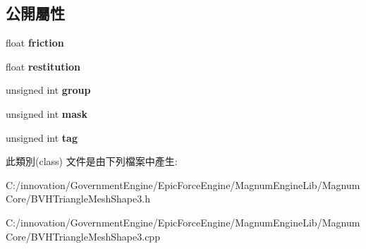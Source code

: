 \subsection*{公開屬性}
\begin{DoxyCompactItemize}
\item 
float {\bfseries friction}\hypertarget{class_i_dream_sky_1_1_b_v_h_triangle_mesh_shape3_1_1_custom_material_add4f999a1ef873de7d8e7ba00ca53660}{}\label{class_i_dream_sky_1_1_b_v_h_triangle_mesh_shape3_1_1_custom_material_add4f999a1ef873de7d8e7ba00ca53660}

\item 
float {\bfseries restitution}\hypertarget{class_i_dream_sky_1_1_b_v_h_triangle_mesh_shape3_1_1_custom_material_ad54d0739a6d91cb87a636f6a88ba6864}{}\label{class_i_dream_sky_1_1_b_v_h_triangle_mesh_shape3_1_1_custom_material_ad54d0739a6d91cb87a636f6a88ba6864}

\item 
unsigned int {\bfseries group}\hypertarget{class_i_dream_sky_1_1_b_v_h_triangle_mesh_shape3_1_1_custom_material_aba6fc3011622439384cff7d9880eda6e}{}\label{class_i_dream_sky_1_1_b_v_h_triangle_mesh_shape3_1_1_custom_material_aba6fc3011622439384cff7d9880eda6e}

\item 
unsigned int {\bfseries mask}\hypertarget{class_i_dream_sky_1_1_b_v_h_triangle_mesh_shape3_1_1_custom_material_ab49b18e07058de14c30c50ba1c710088}{}\label{class_i_dream_sky_1_1_b_v_h_triangle_mesh_shape3_1_1_custom_material_ab49b18e07058de14c30c50ba1c710088}

\item 
unsigned int {\bfseries tag}\hypertarget{class_i_dream_sky_1_1_b_v_h_triangle_mesh_shape3_1_1_custom_material_a46cc0d107a943bae217747c4150fb629}{}\label{class_i_dream_sky_1_1_b_v_h_triangle_mesh_shape3_1_1_custom_material_a46cc0d107a943bae217747c4150fb629}

\end{DoxyCompactItemize}


此類別(class) 文件是由下列檔案中產生\+:\begin{DoxyCompactItemize}
\item 
C\+:/innovation/\+Government\+Engine/\+Epic\+Force\+Engine/\+Magnum\+Engine\+Lib/\+Magnum\+Core/B\+V\+H\+Triangle\+Mesh\+Shape3.\+h\item 
C\+:/innovation/\+Government\+Engine/\+Epic\+Force\+Engine/\+Magnum\+Engine\+Lib/\+Magnum\+Core/B\+V\+H\+Triangle\+Mesh\+Shape3.\+cpp\end{DoxyCompactItemize}
